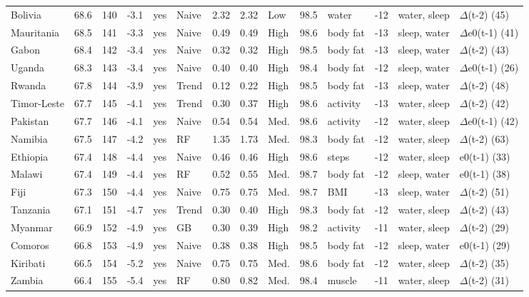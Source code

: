{\begin{longtable}{l r r r c l r r l r l r l l}
Bolivia & 68.6 & 140 & -3.1 & yes & Naive & 2.32 & 2.32 & Low & 98.5 & water & -12 & water, sleep & $\Delta$(t-2) (45) \\
Mauritania & 68.5 & 141 & -3.3 & yes & Naive & 0.49 & 0.49 & High & 98.6 & body fat & -13 & sleep, water & $\Delta$e0(t-1) (41) \\
Gabon & 68.4 & 142 & -3.4 & yes & Naive & 0.32 & 0.32 & High & 98.5 & body fat & -13 & sleep, water & $\Delta$(t-2) (43) \\
Uganda & 68.3 & 143 & -3.4 & yes & Naive & 0.40 & 0.40 & High & 98.4 & body fat & -12 & sleep, water & $\Delta$e0(t-1) (26) \\
Rwanda & 67.8 & 144 & -3.9 & yes & Trend & 0.12 & 0.22 & High & 98.5 & body fat & -13 & sleep, water & $\Delta$(t-2) (48) \\
Timor-Leste & 67.7 & 145 & -4.1 & yes & Trend & 0.30 & 0.37 & High & 98.6 & activity & -13 & water, sleep & $\Delta$(t-2) (42) \\
Pakistan & 67.7 & 146 & -4.1 & yes & Naive & 0.54 & 0.54 & Med. & 98.6 & activity & -12 & water, sleep & $\Delta$e0(t-1) (42) \\
Namibia & 67.5 & 147 & -4.2 & yes & RF & 1.35 & 1.73 & Med. & 98.3 & body fat & -12 & water, sleep & $\Delta$(t-2) (63) \\
Ethiopia & 67.4 & 148 & -4.4 & yes & Naive & 0.46 & 0.46 & High & 98.6 & steps & -12 & water, sleep & e0(t-1) (33) \\
Malawi & 67.4 & 149 & -4.4 & yes & RF & 0.52 & 0.55 & Med. & 98.7 & body fat & -12 & sleep, water & e0(t-1) (38) \\
Fiji & 67.3 & 150 & -4.4 & yes & Naive & 0.75 & 0.75 & Med. & 98.7 & BMI & -13 & sleep, water & $\Delta$(t-2) (51) \\
Tanzania & 67.1 & 151 & -4.7 & yes & Trend & 0.30 & 0.40 & High & 98.3 & body fat & -12 & water, sleep & $\Delta$(t-2) (43) \\
Myanmar & 66.9 & 152 & -4.9 & yes & GB & 0.30 & 0.39 & High & 98.2 & activity & -11 & water, sleep & $\Delta$(t-2) (29) \\
Comoros & 66.8 & 153 & -4.9 & yes & Naive & 0.38 & 0.38 & High & 98.5 & body fat & -12 & sleep, water & e0(t-1) (29) \\
Kiribati & 66.5 & 154 & -5.2 & yes & Naive & 0.75 & 0.75 & Med. & 98.6 & body fat & -12 & water, sleep & $\Delta$(t-2) (35) \\
Zambia & 66.4 & 155 & -5.4 & yes & RF & 0.80 & 0.82 & Med. & 98.4 & muscle & -11 & water, sleep & $\Delta$(t-2) (31) \\

\end{longtable}}
